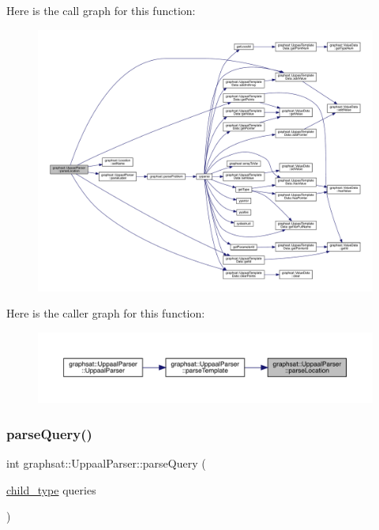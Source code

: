 Here is the call graph for this function\+:
\nopagebreak
\begin{figure}[H]
\begin{center}
\leavevmode
\includegraphics[width=350pt]{classgraphsat_1_1_uppaal_parser_a7d6c4e8f548cf5abe26ea192eaf4a0e2_cgraph}
\end{center}
\end{figure}
Here is the caller graph for this function\+:
\nopagebreak
\begin{figure}[H]
\begin{center}
\leavevmode
\includegraphics[width=350pt]{classgraphsat_1_1_uppaal_parser_a7d6c4e8f548cf5abe26ea192eaf4a0e2_icgraph}
\end{center}
\end{figure}
\mbox{\label{classgraphsat_1_1_uppaal_parser_a100e59360c8910f1dad2f0646255ffcc}} 
\subsubsection{\texorpdfstring{parseQuery()}{parseQuery()}}
{\footnotesize\ttfamily int graphsat\+::\+Uppaal\+Parser\+::parse\+Query (\begin{DoxyParamCaption}\item[{\mbox{\hyperlink{namespacegraphsat_aba2f5cf076d49898cc0469bee94d3a05}{child\+\_\+type}}}]{queries }\end{DoxyParamCaption})\hspace{0.3cm}{\ttfamily [private]}}

